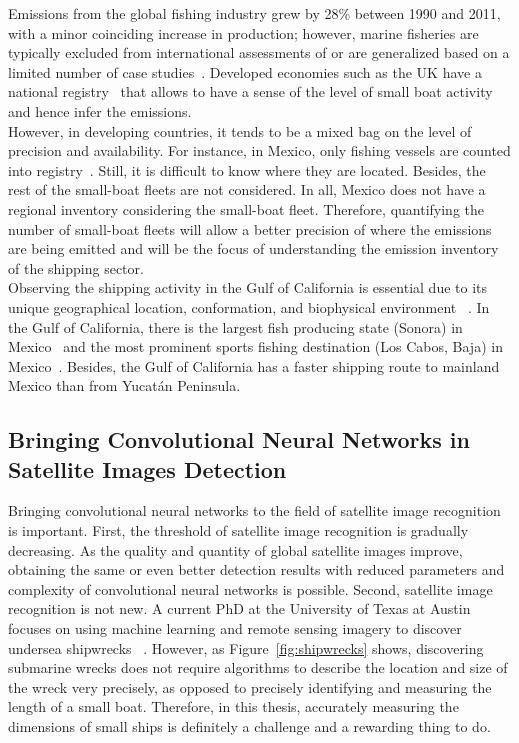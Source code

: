 Emissions from the global fishing industry grew by 28\% between 1990 and 2011, with a minor coinciding increase in production; however, marine fisheries are typically excluded from international assessments of  or are generalized based on a limited number of case studies~\cite{parker2018fuel}. Developed economies such as the UK have a national registry~\cite{uk2021registration} that allows to have a sense of the level of small boat activity and hence infer the  emissions.\\

However, in developing countries, it tends to be a mixed bag on the level of precision and availability. For instance, in Mexico, only fishing vessels are counted into registry~\cite{Mexico2021RegisteredVessels}. Still, it is difficult to know where they are located. Besides, the rest of the small-boat fleets are not considered. In all, Mexico does not have a regional  inventory considering the small-boat fleet. Therefore, quantifying the number of small-boat fleets will allow a better precision of where the emissions are being emitted and will be the focus of understanding the emission inventory of the shipping sector.\\


Observing the shipping activity in the Gulf of California is essential due to its unique geographical location, conformation, and biophysical environment ~\cite{LLUCHCOTA20071, munguia2018ecological, MARINONE2012133}. In the Gulf of California, there is the largest fish producing state (Sonora) in Mexico~\cite{MELTZER2006222} and the most prominent sports fishing destination (Los Cabos, Baja) in Mexico~\cite{hernandez2012economic}. Besides, the Gulf of California has a faster shipping route to mainland Mexico than from Yucatán Peninsula.\\

\subsection{Bringing Convolutional Neural Networks in Satellite Images Detection}
Bringing convolutional neural networks to the field of satellite image recognition is important. First, the threshold of satellite image recognition is gradually decreasing. As the quality and quantity of global satellite images improve, obtaining the same or even better detection results with reduced parameters and complexity of convolutional neural networks is possible. Second, satellite image recognition is not new. A current PhD at the University of Texas at Austin focuses on using machine learning and remote sensing imagery to discover undersea shipwrecks ~\cite{character2021archaeologic}. However, as Figure~\ref {fig:shipwrecks} shows, discovering submarine wrecks does not require algorithms to describe the location and size of the wreck very precisely, as opposed to precisely identifying and measuring the length of a small boat. Therefore, in this thesis, accurately measuring the dimensions of small ships is definitely a challenge and a rewarding thing to do.


